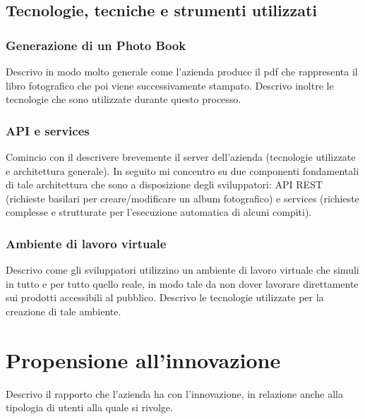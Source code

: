 		\subsection{Tecnologie, tecniche e strumenti utilizzati}
			\subsubsection{Generazione di un Photo Book}
				Descrivo in modo molto generale come l'azienda produce il pdf che rappresenta il libro fotografico che poi viene
				successivamente stampato. Descrivo inoltre le tecnologie che sono utilizzate durante questo processo.
			\subsubsection{API e services}
				Comincio con il descrivere brevemente il server dell'azienda (tecnologie utilizzate e architettura generale). In
				seguito mi concentro su due componenti fondamentali di tale architettura che sono a disposizione degli sviluppatori:
				API REST (richieste basilari per creare/modificare un album fotografico) e services (richieste complesse e
				strutturate per l'esecuzione automatica di alcuni compiti).
			\subsubsection{Ambiente di lavoro virtuale}
				Descrivo come gli sviluppatori utilizzino un ambiente di lavoro virtuale che simuli in tutto e per tutto quello
				reale, in modo tale da non dover lavorare direttamente sui prodotti accessibili al pubblico. Descrivo le tecnologie
				utilizzate per la creazione di tale ambiente.
	\section{Propensione all'innovazione}
		Descrivo il rapporto che l'azienda ha con l'innovazione, in relazione anche alla tipologia di utenti alla quale si rivolge.
